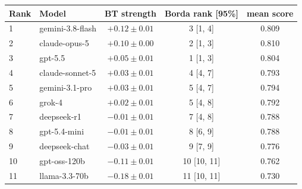 \begin{tabular}{llccc}
\toprule
Rank & Model & BT strength & Borda rank [95\%] & mean score \\
\midrule
1 & gemini-3.8-flash & $+0.12 \pm 0.01$ & 3 [1, 4] & 0.809 \\
2 & claude-opus-5 & $+0.10 \pm 0.00$ & 2 [1, 3] & 0.810 \\
3 & gpt-5.5 & $+0.05 \pm 0.01$ & 1 [1, 3] & 0.804 \\
4 & claude-sonnet-5 & $+0.03 \pm 0.01$ & 4 [4, 7] & 0.793 \\
5 & gemini-3.1-pro & $+0.03 \pm 0.01$ & 5 [4, 7] & 0.794 \\
6 & grok-4 & $+0.02 \pm 0.01$ & 5 [4, 8] & 0.792 \\
7 & deepseek-r1 & $-0.01 \pm 0.01$ & 7 [4, 8] & 0.788 \\
8 & gpt-5.4-mini & $-0.01 \pm 0.01$ & 8 [6, 9] & 0.788 \\
9 & deepseek-chat & $-0.03 \pm 0.01$ & 9 [7, 9] & 0.776 \\
10 & gpt-oss-120b & $-0.11 \pm 0.01$ & 10 [10, 11] & 0.762 \\
11 & llama-3.3-70b & $-0.18 \pm 0.01$ & 11 [10, 11] & 0.730 \\
\bottomrule
\end{tabular}
